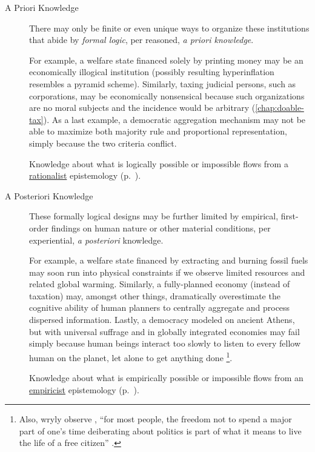 \begin{description}
	\item[A Priori Knowledge  \label{itm:a-priori}]
	There may only be finite or even unique ways to organize these institutions that abide by \emph{formal logic}, per reasoned, \emph{a priori knowledge}.

	For example, a welfare state financed solely by printing money may be an economically illogical institution (possibly resulting hyperinflation resembles a pyramid scheme).
	Similarly, taxing judicial persons, such as corporations, may be economically nonsensical because such organizations are no moral subjects and the incidence would be arbitrary (\autoref{chap:doable-tax}). %
	As a last example, a democratic aggregation mechanism may not be able to maximize both majority rule and proportional representation, simply because the two criteria conflict.

	Knowledge about what is logically possible or impossible flows from a \hyperref[itm:rationalism]{rationalist} epistemology (p.~\pageref{itm:rationalism}).

	\item[A Posteriori Knowledge  \label{itm:a-posteriori}]
	These formally logical designs may be further limited by empirical, first-order findings on human nature or other material conditions, per experiential, \emph{a posteriori} knowledge.

	For example, a welfare state financed by extracting and burning fossil fuels may soon run into physical constraints if we observe limited resources and related global warming.
	Similarly, a fully-planned economy (instead of taxation) may, amongst other things, dramatically overestimate the cognitive ability of human planners to centrally aggregate and process dispersed information.
	Lastly, a democracy modeled on ancient Athens, but with universal suffrage and in globally integrated economies may fail simply because human beings interact too slowly to listen to every fellow human on the planet, let alone to get anything done
	\footnote{
		Also, wryly observe \citeauthor{GutmannThompson-2004-aa}, ``for most people, the freedom not to spend a major part of one's time deiberating about politics is part of what it means to live the life of a free citizen'' \citeyearpar[30]{GutmannThompson-2004-aa}.
	}.

	Knowledge about what is empirically possible or impossible flows from an \hyperref[itm:empiricism]{empiricist} epistemology (p.~\pageref{itm:empiricism}).
\end{description}

